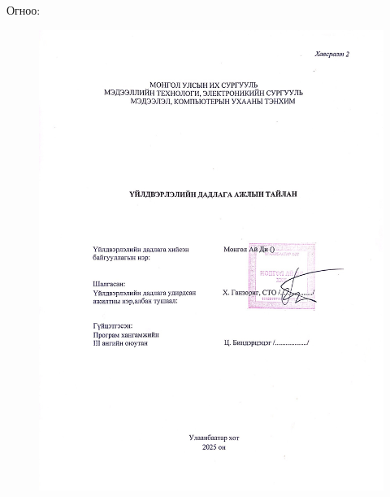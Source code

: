 Огноо: 	\ \ \underline{\hspace{3cm}}
\newpage
\begin{figure}
	\centering
	\includegraphics[width=17cm]{images/todorhoilolt.png}
	\label{fig:todorhoilolt}
\end{figure}
\newpage
